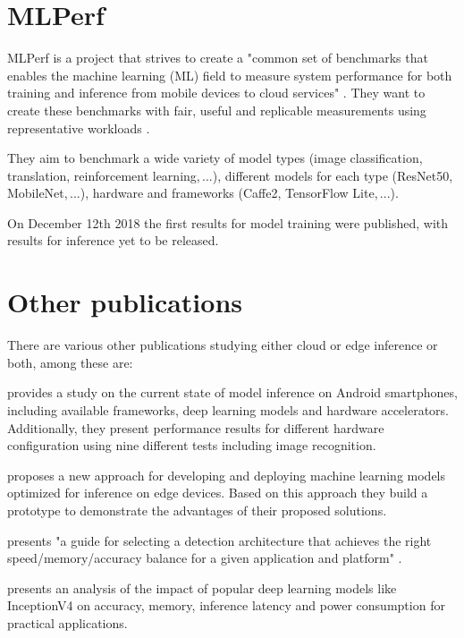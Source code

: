 \section{MLPerf}
MLPerf is a project that strives to create a "common set of benchmarks that enables the machine learning (ML) field to measure system performance for both training and inference from mobile devices to cloud services" \cite{mlperfWebsite}.
They want to create these benchmarks with fair, useful and replicable  measurements using representative workloads \cite{mlperf}. 

They aim to benchmark a wide variety of model types (image classification, translation, reinforcement learning,\,...), different models for each type (ResNet50, MobileNet,\,...), hardware and frameworks (Caffe2, TensorFlow Lite,\,...).

On December 12th 2018 the first results for model training were published, with results for inference yet to be released.


\section{Other publications}
There are various other publications studying either cloud or edge inference or both, among these are:



\cite{DBLP:journals/corr/abs-1810-01109} provides a study on the current state of model inference on Android smartphones, including available frameworks, deep learning models and hardware accelerators. Additionally, they present performance results for different hardware configuration using nine different tests including image recognition.

\cite{rethinkingDeployment} proposes a new approach for developing and deploying machine learning models optimized for inference on edge devices. Based on this approach they build a prototype to demonstrate the advantages of their proposed solutions.


\cite{DBLP:journals/corr/HuangRSZKFFWSG016} presents "a guide for selecting a detection architecture that achieves the right
speed/memory/accuracy balance for a given application and platform" \cite{DBLP:journals/corr/HuangRSZKFFWSG016}.



\cite{DBLP:journals/corr/CanzianiPC16} presents an analysis of the impact of popular deep learning models like InceptionV4 on accuracy, memory, inference latency and power consumption for practical applications.


